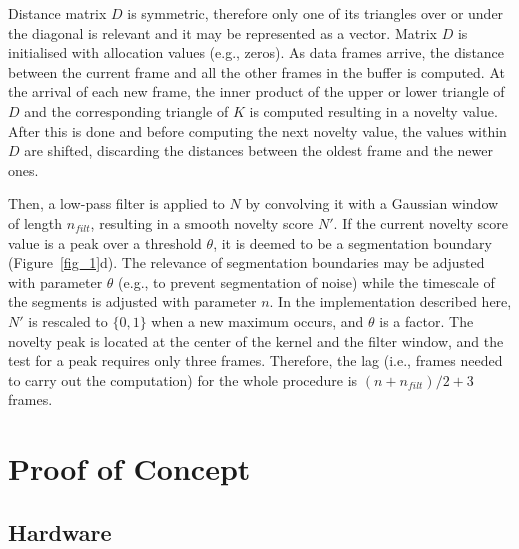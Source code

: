 \documentclass{nime-alternate_MANUSCRIPT} %
\begin{document}
Distance matrix $D$ is symmetric, therefore only one of its triangles over or under the diagonal is relevant and it may be represented as a vector. Matrix $D$ is initialised with allocation values (e.g., zeros). As data frames arrive, the  distance between the current frame and all the other frames in the buffer is computed. At the arrival of each new frame, the inner product of the upper or lower triangle of $D$ and the corresponding triangle of $K$ is computed resulting in a novelty value. After this is done and before computing the next novelty value, the values within $D$ are shifted, discarding the distances between the oldest frame and the newer ones.

Then, a low-pass filter is applied to $N$ by convolving it with a Gaussian window of length $n_{filt}$, resulting in a smooth novelty score $N'$. If the current novelty score value is a peak over a threshold $\theta$, it is deemed to be a segmentation boundary (Figure~\ref{fig_1}d). The relevance of segmentation boundaries may be adjusted with parameter $\theta$ (e.g., to prevent segmentation of noise) while the timescale of the segments is adjusted with parameter $n$. In the implementation described here, $N'$ is rescaled to $\{0,1\}$ when a new maximum occurs, and $\theta$ is a factor. The novelty peak is located at the center of the kernel and the filter window, and the test for a peak requires only three frames. Therefore, the lag (i.e., frames needed to carry out the computation) for the whole procedure is $(n+ n_{filt})/2+3$ frames.

\section{Proof of Concept}

\subsection{Hardware}
\end{document}
